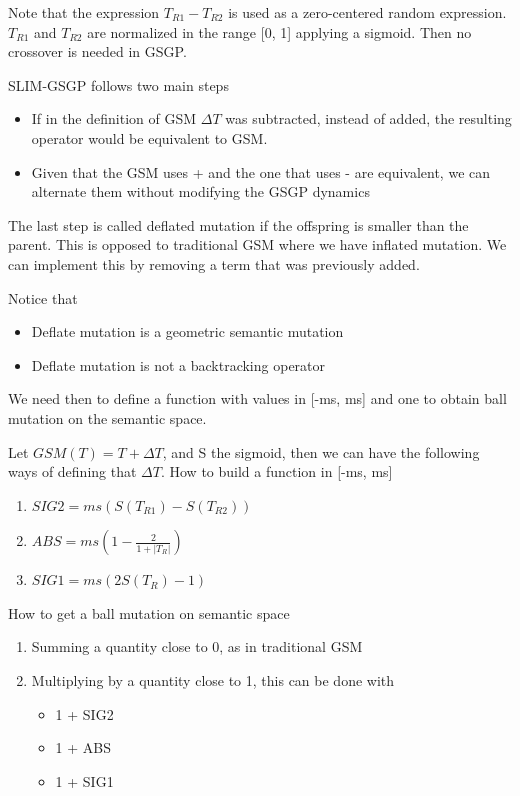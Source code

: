 Note that the expression $T_{R1} - T_{R2}$ is used as a zero-centered random expression. $T_{R1}$ and $T_{R2}$ are normalized in the range [0, 1] applying a sigmoid. Then no crossover is needed in GSGP. 

\vspace{10pt}

SLIM-GSGP follows two main steps

\begin{itemize}
    \item If in the definition of GSM $\Delta T$ was subtracted, instead of added, the resulting operator would be equivalent to GSM. 
    \item Given that the GSM uses + and the one that uses - are equivalent, we can alternate them without modifying the GSGP dynamics
\end{itemize}

The last step is called deflated mutation if the offspring is smaller than the parent. This is opposed to traditional GSM where we have inflated mutation. We can implement this by removing a term that was previously added. 

Notice that

\begin{itemize}
    \item Deflate mutation is a geometric semantic mutation
    \item Deflate mutation is not a backtracking operator
\end{itemize}

We need then to define a function with values in [-ms, ms] and one to obtain ball mutation on the semantic space.

\vspace{10pt}

Let $GSM(T)=T+\Delta T$, and S the sigmoid, then we can have the following ways of defining that $\Delta T$. How to build a function in [-ms, ms]

\begin{enumerate}
    \item $SIG2 = ms(S(T_{R1})-S(T_{R2}))$
    \item $ABS = ms(1- \frac{2}{1 + |T_R|})$
    \item $SIG1 = ms(2S(T_R)-1)$
\end{enumerate}


How to get a ball mutation on semantic space

\begin{enumerate}
    \item Summing a quantity close to 0, as in traditional GSM
    \item Multiplying by a quantity close to 1, this can be done with
    \begin{itemize}
        \item 1 + SIG2
        \item 1 + ABS
        \item 1 + SIG1
    \end{itemize}
\end{enumerate}

